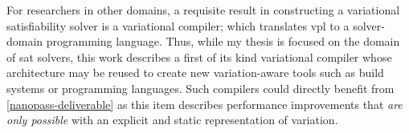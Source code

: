 For researchers in other domains, a requisite result in constructing a
variational satisfiability solver is a variational compiler; which translates
\ac{vpl} to a solver-domain programming language. Thus, while my thesis is
focused on the domain of \ac{sat} solvers, this work describes a first of its
kind variational compiler whose architecture may be reused to create new
variation-aware tools such as build systems or programming languages. Such
compilers could directly benefit from \autoref{nanopass-deliverable} as this
item describes performance improvements that \emph{are only possible} with an
explicit and static representation of variation.

